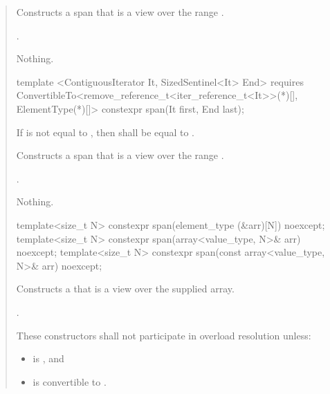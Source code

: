\documentclass{wg21}
\begin{document}
\begin{quote}
\begin{removedblock}
\begin{itemdescr}
	\pnum
	\effects
	Constructs a span that is a view over the range .

	\pnum
	\ensures
	.

	\pnum
	\throws
	Nothing.
\end{itemdescr}
\end{removedblock}

\begin{addedblock}
\begin{itemdecl}
template <ContiguousIterator It, SizedSentinel<It> End>
requires ConvertibleTo<remove_reference_t<iter_reference_t<It>>(*)[], ElementType(*)[]>
constexpr span(It first, End last);
\end{itemdecl}
\end{addedblock}

\begin{addedblock}

\begin{itemdescr}

	\pnum
	\expects
	If  is not equal to ,
	then  shall be equal to .

	\pnum
	\effects
	Constructs a span that is a view over the range .

	\pnum
	\ensures
	.

	\pnum
	\throws
	Nothing.

\end{itemdescr}
\end{addedblock}

\begin{itemdecl}
template<size_t N> constexpr span(element_type (&arr)[N]) noexcept;
template<size_t N> constexpr span(array<value_type, N>& arr) noexcept;
template<size_t N> constexpr span(const array<value_type, N>& arr) noexcept;
\end{itemdecl}
\begin{itemdescr}
	\pnum
	\effects
	Constructs a  that is a view over the supplied array.

	\pnum
	\ensures
	.

	\pnum
	\remarks
	These constructors shall not participate in overload resolution unless:
	\begin{itemize}
		\item {} is , and
		\item {} is convertible to .
	\end{itemize}
\end{itemdescr}


\end{quote}
\end{document}
